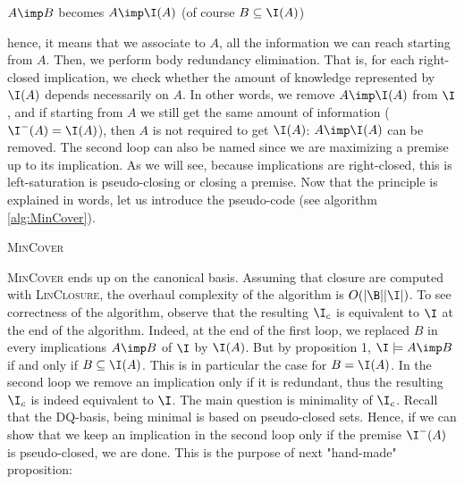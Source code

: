 \begin{center} $A \imp B$ becomes $A \imp \I(A)$ (of course $B \subseteq 
	\I(A)$)
\end{center}

\noindent hence, it means that we associate to $A$, all the information we can 
reach starting from $A$. Then, we perform body redundancy elimination. That is, 
for each right-closed implication, we check whether the amount of knowledge 
represented by $\I(A)$ depends necessarily on $A$. In other words, we remove
$A \imp \I(A)$ from $\I$, and if starting from $A$ we still get the same amount 
of information ($\I^{-}(A) = \I(A)$), then $A$ is not required to get $\I(A)$: $A \imp \I(A)$ can be removed. The second loop can also be named  since we are maximizing a premise up to its implication. As we will see, because implications are right-closed, this is left-saturation is pseudo-closing  or closing a premise. Now that the principle is explained in words, let us introduce the pseudo-code (see 
algorithm \ref{alg:MinCover}).

\vspace{1.2em}

\begin{algorithm}
	
	\BlankLine
	\BlankLine
	
	
	\BlankLine
	
	
	\caption{\textsc{MinCover}}
	\label{alg:MinCover}	
\end{algorithm}

\textsc{MinCover} ends up on the canonical basis. Assuming that 
closure are computed with \textsc{LinClosure}, the overhaul complexity of
the algorithm is $O(|\B||\I|)$. To see correctness of the algorithm, observe
that the resulting $\I_c$ is equivalent to $\I$ at the end of the algorithm.
Indeed, at the end of the first loop, we replaced $B$ in every implications $A 
\imp B$ of $\I$ by $\I(A)$. But by proposition 1, $\I \models A \imp B$ if and 
only if $B \subseteq \I(A)$. This is in particular the case for $B = \I(A)$.
In the second loop we remove an implication only if it is redundant, thus
the resulting $\I_c$ is indeed equivalent to $\I$. The main question is 
minimality of $\I_c$. Recall that the DQ-basis, being minimal is based on 
pseudo-closed sets. Hence, if we can show that we keep an implication in the 
second loop only if the premise $\I^{-}(A)$ is pseudo-closed, we are done. This
is the purpose of next "hand-made" proposition:

